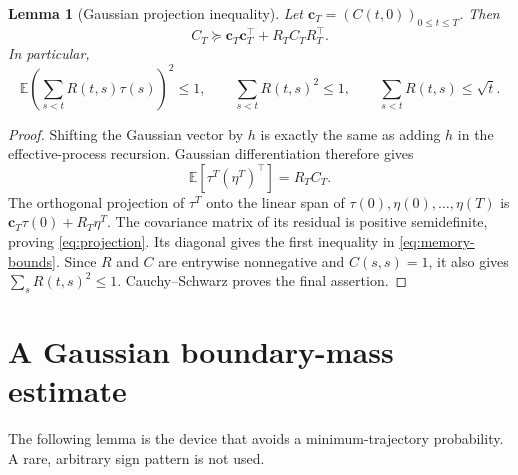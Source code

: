 \documentclass[11pt]{article}
\newtheorem{lemma}[theorem]{Lemma}
\theoremstyle{remark}\newtheorem{remark}[theorem]{Remark}
\newcommand{\E}{\mathbb E}
\begin{document}
\begin{lemma}[Gaussian projection inequality]\label{lem:projection}
Let $\boldsymbol c_T=(C(t,0))_{0\le t\le T}$. Then
\begin{equation}\label{eq:projection}
 C_T\succeq \boldsymbol c_T\boldsymbol c_T^\top+R_TC_TR_T^\top.
\end{equation}
In particular,
\begin{equation}\label{eq:memory-bounds}
 \E\left(\sum_{s<t}R(t,s)\tau(s)\right)^2\le1,
 \qquad \sum_{s<t}R(t,s)^2\le1,
 \qquad \sum_{s<t}R(t,s)\le\sqrt t.
\end{equation}
\end{lemma}
\begin{proof}
Shifting the Gaussian vector by $h$ is exactly the same as adding $h$ in
the effective-process recursion. Gaussian differentiation therefore gives
\[
 \E[\tau^T(\eta^T)^\top]=R_TC_T.
\]
The orthogonal projection of $\tau^T$ onto the linear span of
$\tau(0),\eta(0),\ldots,\eta(T)$ is
$\boldsymbol c_T\tau(0)+R_T\eta^T$. The covariance matrix of its residual is
positive semidefinite, proving \eqref{eq:projection}.
Its diagonal gives the first inequality in \eqref{eq:memory-bounds}.
Since $R$ and $C$ are entrywise nonnegative and $C(s,s)=1$, it also gives
$\sum_sR(t,s)^2\le1$. Cauchy--Schwarz proves the final assertion.
\end{proof}

\section{A Gaussian boundary-mass estimate}
The following lemma is the device that avoids a minimum-trajectory
probability. A rare, arbitrary sign pattern is not used.
\end{document}
